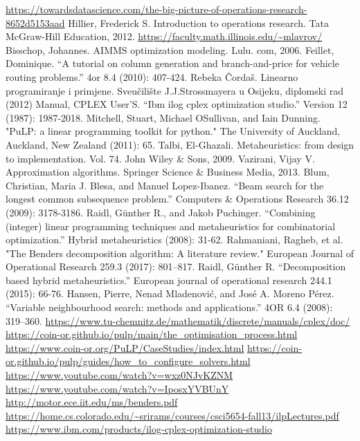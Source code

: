 \documentclass[a4paper, utf8, 11pt, colorlinks]{book}
\theoremstyle{definition}
\begin{document}
\begin{thebibliography}{widest entry}
	  \url{https://towardsdatascience.com/the-big-picture-of-operations-research-8652d5153aad}
	 Hillier, Frederick S. Introduction to operations research. Tata McGraw-Hill Education, 2012.
	  \url{https://faculty.math.illinois.edu/~mlavrov/}
	   Bisschop, Johannes. AIMMS optimization modeling. Lulu. com, 2006.
	   Feillet, Dominique. ``A tutorial on column generation and branch-and-price for vehicle routing problems.'' 4or 8.4 (2010): 407-424.
	    Rebeka Čordaš. Linearno programiranje i primjene. Sveu\v cili\v ste J.J.Strossmayera u Osijeku, diplomski rad (2012)
	     Manual, CPLEX User’S. ``Ibm ilog cplex optimization studio.'' Version 12 (1987): 1987-2018.
	   Mitchell, Stuart, Michael OSullivan, and Iain Dunning. "PuLP: a linear programming toolkit for python." The University of Auckland, Auckland, New Zealand (2011): 65.
	      Talbi, El-Ghazali. Metaheuristics: from design to implementation. Vol. 74. John Wiley \& Sons, 2009.
	       Vazirani, Vijay V. Approximation algorithms. Springer Science \& Business Media, 2013.
	        Blum, Christian, Maria J. Blesa, and Manuel Lopez-Ibanez. ``Beam search for the longest common subsequence problem.'' Computers \& Operations Research 36.12 (2009): 3178-3186.
	      Raidl, Günther R., and Jakob Puchinger. ``Combining (integer) linear programming techniques and metaheuristics for combinatorial optimization.'' Hybrid metaheuristics (2008): 31-62.
	           Rahmaniani, Ragheb, et al. "The Benders decomposition algorithm: A literature review." European Journal of Operational Research 259.3 (2017): 801--817.
	         Raidl, Günther R. ``Decomposition based hybrid metaheuristics.'' European journal of operational research 244.1 (2015): 66-76.
	        Hansen, Pierre, Nenad Mladenović, and José A. Moreno Pérez. ``Variable neighbourhood search: methods and applications.'' 4OR 6.4 (2008): 319--360.
	       \url{https://www.tu-chemnitz.de/mathematik/discrete/manuals/cplex/doc/}%
	       \url{https://coin-or.github.io/pulp/main/the\_optimisation\_process.html}
	       \url{https://www.coin-or.org/PuLP/CaseStudies/index.html}
	        \url{https://coin-or.github.io/pulp/guides/how\_to\_configure\_solvers.html}
            \url{https://www.youtube.com/watch?v=wxz0NJvKZNM}
            \url{https://www.youtube.com/watch?v=IposxYVBUnY}
             \url{http://motor.ece.iit.edu/ms/benders.pdf}
             \url{https://home.cs.colorado.edu/\~srirams/courses/csci5654-fall13/ilpLectures.pdf}
    \url{https://www.ibm.com/products/ilog-cplex-optimization-studio}
  

\end{thebibliography}
\end{document}
